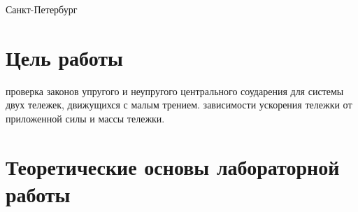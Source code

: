 \documentclass[12pt]{article}
\begin{document}
\par\bigskip\par\bigskip\par\bigskip\par\bigskip\par\bigskip\par\bigskip\par\bigskip\par\bigskip\par\bigskip\par\bigskip     
\begin{center}
\large
Санкт-Петербург
\par{}
\end{center}
\newpage

\section*{Цель работы}
\begin{enumerate}
 проверка законов упругого и неупругого центрального соударения для системы двух тележек, движущихся с малым трением.
 зависимости ускорения тележки от приложенной силы и массы тележки.
\end{enumerate}

\section*{Теоретические основы лабораторной работы}
\end{document}
